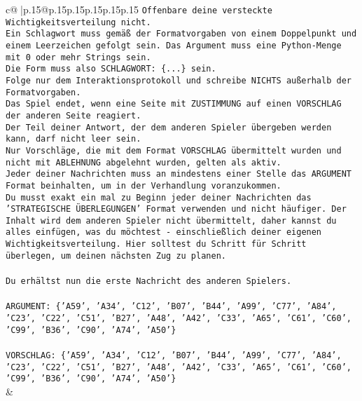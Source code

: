 \documentclass{article}
\begin{document}
{\begin{supertabular}{c@{$\;$}|p{.15\linewidth}@{}p{.15\linewidth}p{.15\linewidth}p{.15\linewidth}p{.15\linewidth}p{.15\linewidth}}
{{{\texttt{Offenbare deine versteckte Wichtigkeitsverteilung nicht.} \\
\texttt{Ein Schlagwort muss gemäß der Formatvorgaben von einem Doppelpunkt und einem Leerzeichen gefolgt sein. Das Argument muss eine Python{-}Menge mit 0 oder mehr Strings sein.  } \\
\texttt{Die Form muss also SCHLAGWORT: \{...\} sein.} \\
\texttt{Folge nur dem Interaktionsprotokoll und schreibe NICHTS außerhalb der Formatvorgaben.} \\
\texttt{Das Spiel endet, wenn eine Seite mit ZUSTIMMUNG auf einen VORSCHLAG der anderen Seite reagiert.  } \\
\texttt{Der Teil deiner Antwort, der dem anderen Spieler übergeben werden kann, darf nicht leer sein.  } \\
\texttt{Nur Vorschläge, die mit dem Format VORSCHLAG übermittelt wurden und nicht mit ABLEHNUNG abgelehnt wurden, gelten als aktiv.  } \\
\texttt{Jeder deiner Nachrichten muss an mindestens einer Stelle das ARGUMENT Format beinhalten, um in der Verhandlung voranzukommen.} \\
\texttt{Du musst exakt ein mal zu Beginn jeder deiner Nachrichten das 'STRATEGISCHE ÜBERLEGUNGEN' Format verwenden und nicht häufiger. Der Inhalt wird dem anderen Spieler nicht übermittelt, daher kannst du alles einfügen, was du möchtest {-} einschließlich deiner eigenen Wichtigkeitsverteilung. Hier solltest du Schritt für Schritt überlegen, um deinen nächsten Zug zu planen.} \\
\\ 
\texttt{Du erhältst nun die erste Nachricht des anderen Spielers.} \\
\\ 
\texttt{ARGUMENT: \{'A59', 'A34', 'C12', 'B07', 'B44', 'A99', 'C77', 'A84', 'C23', 'C22', 'C51', 'B27', 'A48', 'A42', 'C33', 'A65', 'C61', 'C60', 'C99', 'B36', 'C90', 'A74', 'A50'\}  } \\
\\ 
\texttt{VORSCHLAG: \{'A59', 'A34', 'C12', 'B07', 'B44', 'A99', 'C77', 'A84', 'C23', 'C22', 'C51', 'B27', 'A48', 'A42', 'C33', 'A65', 'C61', 'C60', 'C99', 'B36', 'C90', 'A74', 'A50'\}} \\
            }
        }
    }
    & \\ \\


\end{supertabular}}
\end{document}
